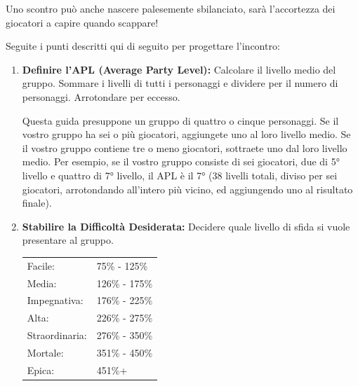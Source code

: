 \documentclass[a4paper,twoside,openany]{book}
\begin{document}
Uno scontro può anche nascere palesemente sbilanciato, sarà l'accortezza dei giocatori a capire quando scappare!

Seguite i punti descritti qui di seguito per progettare l'incontro:

\begin{enumerate}[leftmargin=*] \setlength{\itemsep}{0pt}
	\item \textbf{Definire l'APL (Average Party Level):} Calcolare il livello medio del gruppo. Sommare i livelli di tutti i personaggi e dividere per il numero di personaggi. Arrotondare per eccesso.
	
	Questa guida presuppone un gruppo di quattro o cinque personaggi. Se il vostro gruppo ha sei o più giocatori, aggiungete uno al loro livello medio. Se il vostro gruppo contiene tre o meno giocatori, sottraete uno dal loro livello medio. Per esempio, se il vostro gruppo consiste di sei giocatori, due di 5° livello e quattro di 7° livello, il APL è il 7° (38 livelli totali, diviso per sei giocatori, arrotondando all'intero più vicino, ed aggiungendo uno al risultato finale).
	
	
	\item \textbf{Stabilire la Difficoltà Desiderata:} Decidere quale livello di sfida si vuole presentare al gruppo.
	
	
	
	
	\begin{tabular}{@{}ll@{}} %
		Facile: & 75\% - 125\% \\
		Media: & 126\% - 175\% \\
		Impegnativa: & 176\% - 225\% \\
		Alta: & 226\% - 275\% \\
		Straordinaria: & 276\% - 350\% \\
		Mortale: & 351\% - 450\% \\
		Epica: & 451\%+
	\end{tabular}
	

\end{enumerate}
\end{document}
